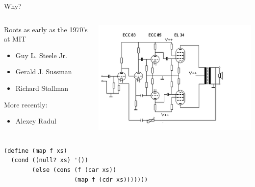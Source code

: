 \documentclass[usenames,dvipsnames,svgnames,table,aspectratio=1610,mathserif]{beamer}
\newcommand{\nl}{\vspace{\baselineskip}}
\begin{document}
\begin{frame}
\begin{columns}
\begin{column}{0.5\textwidth}
\begin{center}
      \nl

      Why?
    \end{center}
  \end{column}
\end{columns}

\end{frame}




\begin{frame}

\begin{columns}
\begin{column}{0.5\textwidth}
Roots as early as the 1970's at MIT
\begin{itemize}
  \item Guy L. Steele Jr. 
  \item Gerald J. Sussman
  \item Richard Stallman
\end{itemize}

\nl

More recently:
\begin{itemize}
  \item Alexey Radul
\end{itemize}
\end{column}
\begin{column}{0.5\textwidth}
\includegraphics[scale=0.6]{circuit.png}
\end{column}
\end{columns}

\end{frame}


\begin{frame}[fragile]

\begin{verbatim}
(define (map f xs)
  (cond ((null? xs) '())
        (else (cons (f (car xs))
                    (map f (cdr xs)))))))
\end{verbatim}
\end{frame}
\end{document}
